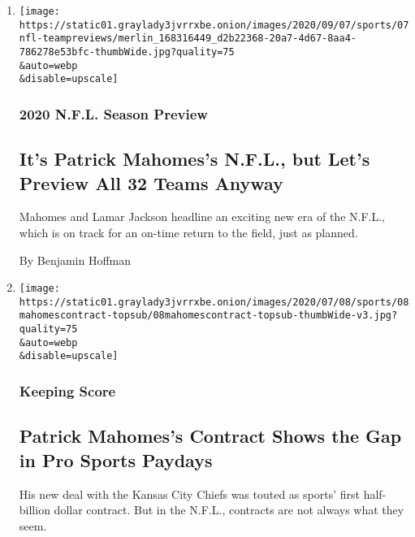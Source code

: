 \begin{enumerate}
\def\labelenumi{\arabic{enumi}.}
\item
  \href{/2020/09/07/sports/football/nfl-team-by-team-season-preview.html}{}

  \texttt{[image: https://static01.graylady3jvrrxbe.onion/images/2020/09/07/sports/07nfl-teampreviews/merlin\_168316449\_d2b22368-20a7-4d67-8aa4-786278e53bfc-thumbWide.jpg?quality=75\\\&auto=webp\\\&disable=upscale]}

  \hypertarget{2020-nfl-season-preview}{%
  \subsubsection{2020 N.F.L. Season
  Preview}\label{2020-nfl-season-preview}}

  \hypertarget{its-patrick-mahomess-nfl-but-lets-preview-all-32-teams-anyway}{%
  \subsection{It's Patrick Mahomes's N.F.L., but Let's Preview All 32
  Teams
  Anyway}\label{its-patrick-mahomess-nfl-but-lets-preview-all-32-teams-anyway}}

  Mahomes and Lamar Jackson headline an exciting new era of the N.F.L.,
  which is on track for an on-time return to the field, just as planned.

  By Benjamin Hoffman
\item
  \href{/2020/07/08/sports/football/patrick-mahomes-contract-guarantee.html}{}

  \texttt{[image: https://static01.graylady3jvrrxbe.onion/images/2020/07/08/sports/08mahomescontract-topsub/08mahomescontract-topsub-thumbWide-v3.jpg?quality=75\\\&auto=webp\\\&disable=upscale]}

  \hypertarget{keeping-score}{%
  \subsubsection{Keeping Score}\label{keeping-score}}

  \hypertarget{patrick-mahomess-contract-shows-the-gap-in-pro-sports-paydays}{%
  \subsection{Patrick Mahomes's Contract Shows the Gap in Pro Sports
  Paydays}\label{patrick-mahomess-contract-shows-the-gap-in-pro-sports-paydays}}

  His new deal with the Kansas City Chiefs was touted as sports' first
  half-billion dollar contract. But in the N.F.L., contracts are not
  always what they seem.


\end{enumerate}
